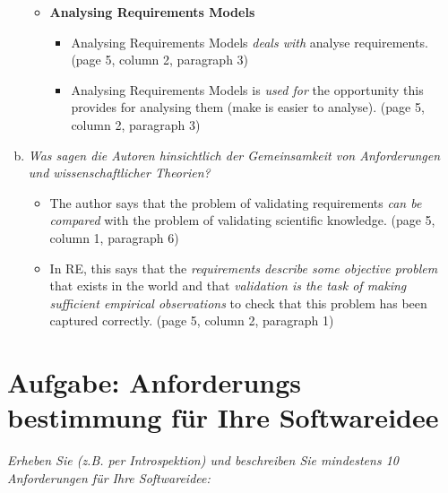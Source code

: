 \begin{enumerate}[a)]
\begin{itemize}
        \item \textbf{Analysing Requirements Models}
        \begin{itemize}
            \item Analysing Requirements Models \emph{deals with} analyse requirements. (page 5, column 2, paragraph 3) 
            \item Analysing Requirements Models is \emph{used for} the opportunity this provides for analysing  them (make is easier to analyse). (page 5, column 2, paragraph 3) 
        \end{itemize}
    \end{itemize}
    
    \item {\itshape Was sagen die Autoren hinsichtlich der Gemeinsamkeit von Anforderungen und wissenschaftlicher Theorien?}
    \begin{itemize}
        \item The author says that the problem of validating requirements \emph{can be compared} with the problem of validating scientific knowledge. (page 5, column 1, paragraph 6) 
        \item In RE, this says that the \emph{requirements describe some objective problem} that exists in the world and that \emph{validation is the task of making sufficient empirical observations} to check that this problem has been captured correctly. (page 5, column 2, paragraph 1) 
    \end{itemize}
\end{enumerate}    


\newpage
\section{Aufgabe: Anforderungs bestimmung für Ihre Softwareidee}
{\itshape Erheben Sie (z.B. per Introspektion) und beschreiben Sie mindestens 10 Anforderungen für Ihre Softwareidee:}

